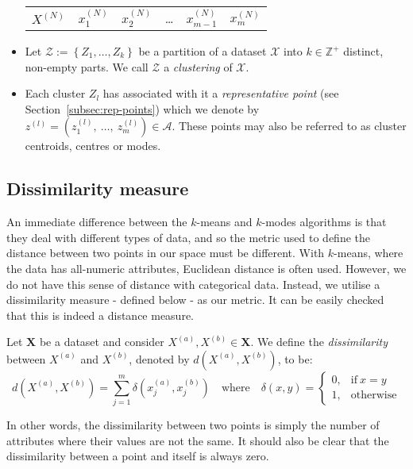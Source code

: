 \begin{itemize}
\begin{table}[H]
\begin{tabular}{cccccc}
            \(X^{(N)}\) & \(x_1^{(N)}\) & \(x_2^{(N)}\) & \quad \ldots \quad &
            \(x_{m-1}^{(N)}\) & \(x_m^{(N)}\)
        \end{tabular}
        \end{table}
    \item Let \(\mathcal{Z} := \left\{Z_1, \ldots, Z_k\right\}\) be a partition
        of a dataset \(\mathcal{X}\) into \(k \in \mathbb{Z}^{+}\) distinct,
        non-empty parts. We call \(\mathcal{Z}\) a \textit{clustering} of
        \(\mathcal{X}\).
    \item Each cluster \(Z_l\) has associated with it a \textit{representative
        point}
		(see Section~\ref{subsec:rep-points}) which we denote by 
        \(z^{(l)} = \left(z_1^{(l)},~\ldots,~z_m^{(l)}\right) \in \mathcal{A}\).
        These points may also be referred to as cluster centroids, centres or
        modes.
\end{itemize}


\subsection{Dissimilarity measure}\label{subsec:dissim}

An immediate difference between the \(k\)-means and \(k\)-modes algorithms is 
that they deal with different types of data, and so the metric used to define 
the distance between two points in our space must be different. With 
\(k\)-means, where the data has all-numeric attributes, Euclidean distance is 
often used. However, we do not have this sense of distance with categorical 
data. Instead, we utilise a dissimilarity measure \-- defined below \-- as our 
metric. It can be easily checked that this is indeed a distance measure.

\begin{definition}\label{def:dissim}
    Let \(\textbf{X}\) be a dataset and consider \(X^{(a)}, X^{(b)} \in
    \textbf{X}\). We define the \emph{dissimilarity} between \(X^{(a)}\) and 
    \(X^{(b)}\), denoted by \(d(X^{(a)}, X^{(b)})\), to be:
    \[
        d(X^{(a)}, X^{(b)}) = \sum_{j=1}^{m} \delta(x_j^{(a)}, x_j^{(b)}) \quad
        \text{where} \quad \delta(x, y) = \begin{cases}
                                              0, & \text{if} \ x = y \\
			    		                      1, & \text{otherwise}
				    	                  \end{cases}
    \]

    In other words, the dissimilarity between two points is simply the number of
    attributes where their values are not the same. It should also be clear that
    the dissimilarity between a point and itself is always zero.
\end{definition}


